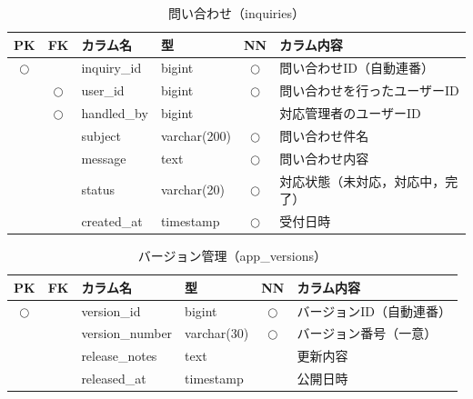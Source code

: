 
\begin{table}[H]
    \centering
    \caption{問い合わせ（inquiries）}
    \label{tab:db_inquiries}
    \small
    \begin{tabularx}{\textwidth}{|c|c|l|l|c|X|}
        \hline
        PK & FK & カラム名 & 型 & NN & カラム内容 \\ \hline
        $\bigcirc$ & & inquiry\_id & bigint & $\bigcirc$ & 問い合わせID（自動連番） \\ \hline
        & $\bigcirc$ & user\_id & bigint & $\bigcirc$ & 問い合わせを行ったユーザーID \\ \hline
        & $\bigcirc$ & handled\_by & bigint & & 対応管理者のユーザーID \\ \hline
        & & subject & varchar(200) & $\bigcirc$ & 問い合わせ件名 \\ \hline
        & & message & text & $\bigcirc$ & 問い合わせ内容 \\ \hline
        & & status & varchar(20) & $\bigcirc$ & 対応状態（未対応，対応中，完了） \\ \hline
        & & created\_at & timestamp & $\bigcirc$ & 受付日時 \\ \hline
    \end{tabularx}
\end{table}



\begin{table}[H]
    \centering
    \caption{バージョン管理（app\_versions）}
    \label{tab:db_app_versions}
    \small
    \begin{tabularx}{\textwidth}{|c|c|l|l|c|X|}
        \hline
        PK & FK & カラム名 & 型 & NN & カラム内容 \\ \hline
        $\bigcirc$ & & version\_id & bigint & $\bigcirc$ & バージョンID（自動連番） \\ \hline
        & & version\_number & varchar(30) & $\bigcirc$ & バージョン番号（一意） \\ \hline
        & & release\_notes & text & & 更新内容 \\ \hline
        & & released\_at & timestamp & & 公開日時 \\ \hline
    \end{tabularx}
\end{table}

\endgroup